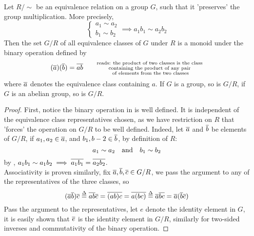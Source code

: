 \documentclass[../main-manifolds.tex]{subfiles}
\begin{document}
\begin{wts}\label{hungerford-chp1:theorem1.5}
    Let $R/\sim$ be an equivalence relation on a group $G$, such that it 'preserves' the group multiplication. More precisely, 
    \[
        \begin{cases}
            a_1\sim a_2\\
            b_1\sim b_2
        \end{cases}\implies a_1b_1\sim a_2b_2
    \]
    Then the set $G/R$ of all equivalence classes of $G$ under $R$ is a monoid under the binary operation defined by 
    \begin{equation}\label{hungerford-chp1:theorem1.5-binary-operation}
        (\overline{a})(\overline{b})=\overline{ab}\quad\quad\substack{\text{reads: the product of two classes is the class}\\  \text{containing the product of any pair}\\ \text{ of elements from the two classes}}
    \end{equation}
    where $\overline{a}$ denotes the equivalence class containing $a$. If $G$ is a group, so is $G/R$, if $G$ is an abelian group, so is $G/R$.
\end{wts}
\begin{proof}
    First, notice the binary operation in  is well defined. It is independent of the equivalence class representatives chosen, as we have restriction on $R$ that 'forces' the operation on $G/R$ to be well defined. Indeed, let $\overline{a}$ and $\overline{b}$ be elements of $G/R$, if $a_1, a_2\in \overline{a}$, and $b_1,b-2\in\overline{b}$, by definition of $R$:
    \[
        a_1\sim a_2\qqtext{and}b_1\sim b_2
    \]
    by , $a_1b_1\sim a_1b_2\implies \overline{a_1b_1}=\overline{a_2b_2}$.\\

    Associativity is proven similarly, fix $\overline{a},\overline{b},\overline{c}\in G/R$, we pass the argument to any of the representatives of the three classes, so
    \[
        (\overline{a}\overline{b})\overline{c}\overset{\Delta}{=} \overline{ab}\overline{c} =  \overline{(ab)c}=\overline{a(bc)}\overset{\Delta}{=}\overline{a}\overline{bc}=\overline{a}(\overline{b}\overline{c})
    \]
    Pass the argument to the representatives, let $e$ denote the identity element in $G$, it is easily shown that $\overline{e}$ is the identity element in $G/R$, similarly for two-sided inverses and commutativity of the binary operation.
\end{proof}

\end{document}
